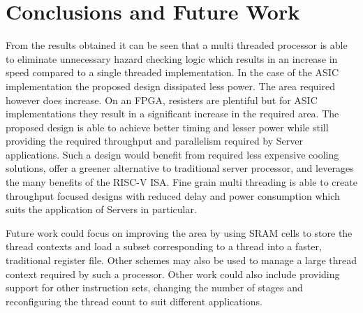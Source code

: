 \documentclass[conference]{IEEEtran}
\begin{document}
\section*{Conclusions and Future Work}
From the results obtained it can be seen that a multi threaded processor is able to eliminate unnecessary hazard checking logic which results in an increase in speed compared to a single threaded implementation. In the case of the ASIC implementation the proposed design dissipated less power. The area required however does increase. On an FPGA, resisters are plentiful but for ASIC implementations they result in a significant increase in the required area. The proposed design is able to achieve better timing and lesser power while still providing the required throughput and parallelism required by Server applications. Such a design would benefit from required less expensive cooling solutions, offer a greener alternative to traditional server processor, and leverages the many benefits of the RISC-V ISA. Fine grain multi threading is able to create throughput focused designs with reduced delay and power consumption which suits the application of Servers in particular.

Future work could focus on improving the area by using SRAM cells to store the thread contexts and load a subset corresponding to a thread into a faster, traditional register file. Other schemes may also be used to manage a large thread context required by such a processor. Other work could also include providing support for other instruction sets, changing the number of stages and reconfiguring the thread count to suit different applications.



\nocite*{}
\vspace{12pt}
\end{document}
